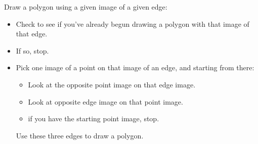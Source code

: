\documentclass[12pt]{amsart}
\begin{document}
\bigskip

Draw a polygon using a given image of a given edge:

\begin{itemize}

\item Check to see if you've already begun drawing a polygon with that image of that edge.

\item If so, stop.

\item Pick one image of a point on that image of an edge, and starting from there:

\begin{itemize}

\item Look at the opposite point image on that edge image.

\item Look at opposite edge image on that point image.

\item if you have the starting point image, stop.

\end{itemize}

Use these three edges to draw a polygon.

\end{itemize}
\end{document}
